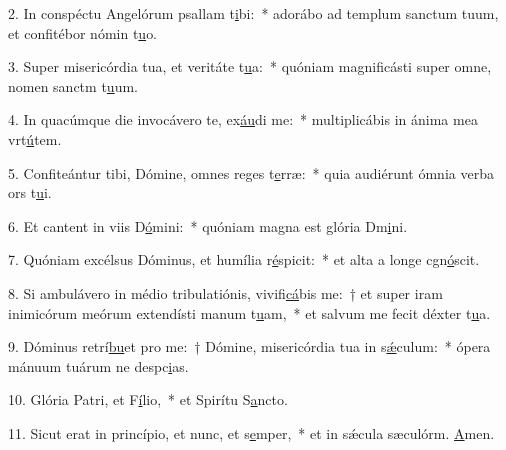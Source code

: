 2. In conspéctu Angelórum psallam t\uline{i}bi:~* adorábo ad templum sanctum tuum, et confitébor nómin t\uline{u}o.\par 
3. Super misericórdia tua, et veritáte t\uline{u}a:~* quóniam magnificásti super omne, nomen sanctm t\uline{u}um.\par 
4. In quacúmque die invocávero te, ex\uline{áu}di me:~* multiplicábis in ánima mea vrt\uline{ú}tem.\par 
5. Confiteántur tibi, Dómine, omnes reges t\uline{e}rræ:~* quia audiérunt ómnia verba ors t\uline{u}i.\par 
6. Et cantent in viis D\uline{ó}mini:~* quóniam magna est glória Dm\uline{i}ni.\par 
7. Quóniam excélsus Dóminus, et humília r\uline{é}spicit:~* et alta a longe cgn\uline{ó}scit.\par 
8. Si ambulávero in médio tribulatiónis, vivifi\uline{cá}bis me:~† et super iram inimicórum meórum extendísti manum t\uline{u}am,~* et salvum me fecit déxter t\uline{u}a.\par 
9. Dóminus retrí\uline{bu}et pro me:~† Dómine, misericórdia tua in s\uline{ǽ}culum:~* ópera mánuum tuárum ne despc\uline{i}as.\par 
10. Glória Patri, et F\uline{í}lio,~* et Spirítu S\uline{a}ncto.\par 
11. Sicut erat in princípio, et nunc, et s\uline{e}mper,~* et in sǽcula sæculórm. \uline{A}men.\par 
